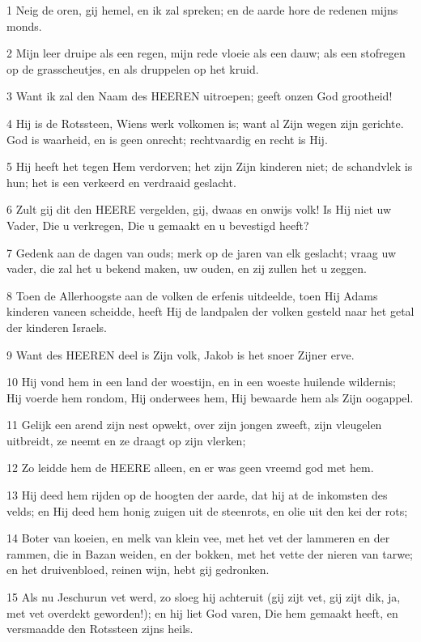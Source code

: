 \par 1 Neig de oren, gij hemel, en ik zal spreken; en de aarde hore de redenen mijns monds.
\par 2 Mijn leer druipe als een regen, mijn rede vloeie als een dauw; als een stofregen op de grasscheutjes, en als druppelen op het kruid.
\par 3 Want ik zal den Naam des HEEREN uitroepen; geeft onzen God grootheid!
\par 4 Hij is de Rotssteen, Wiens werk volkomen is; want al Zijn wegen zijn gerichte. God is waarheid, en is geen onrecht; rechtvaardig en recht is Hij.
\par 5 Hij heeft het tegen Hem verdorven; het zijn Zijn kinderen niet; de schandvlek is hun; het is een verkeerd en verdraaid geslacht.
\par 6 Zult gij dit den HEERE vergelden, gij, dwaas en onwijs volk! Is Hij niet uw Vader, Die u verkregen, Die u gemaakt en u bevestigd heeft?
\par 7 Gedenk aan de dagen van ouds; merk op de jaren van elk geslacht; vraag uw vader, die zal het u bekend maken, uw ouden, en zij zullen het u zeggen.
\par 8 Toen de Allerhoogste aan de volken de erfenis uitdeelde, toen Hij Adams kinderen vaneen scheidde, heeft Hij de landpalen der volken gesteld naar het getal der kinderen Israels.
\par 9 Want des HEEREN deel is Zijn volk, Jakob is het snoer Zijner erve.
\par 10 Hij vond hem in een land der woestijn, en in een woeste huilende wildernis; Hij voerde hem rondom, Hij onderwees hem, Hij bewaarde hem als Zijn oogappel.
\par 11 Gelijk een arend zijn nest opwekt, over zijn jongen zweeft, zijn vleugelen uitbreidt, ze neemt en ze draagt op zijn vlerken;
\par 12 Zo leidde hem de HEERE alleen, en er was geen vreemd god met hem.
\par 13 Hij deed hem rijden op de hoogten der aarde, dat hij at de inkomsten des velds; en Hij deed hem honig zuigen uit de steenrots, en olie uit den kei der rots;
\par 14 Boter van koeien, en melk van klein vee, met het vet der lammeren en der rammen, die in Bazan weiden, en der bokken, met het vette der nieren van tarwe; en het druivenbloed, reinen wijn, hebt gij gedronken.
\par 15 Als nu Jeschurun vet werd, zo sloeg hij achteruit (gij zijt vet, gij zijt dik, ja, met vet overdekt geworden!); en hij liet God varen, Die hem gemaakt heeft, en versmaadde den Rotssteen zijns heils.
